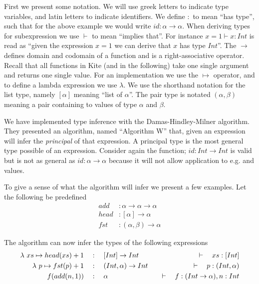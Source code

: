First we present some notation. We will use greek letters to indicate type variables, and latin letters to indicate identifiers. We define $:$ to mean ``has type'', such that for the above example we would write $id: \alpha \to \alpha$. When deriving types for subexpression we use $\vdash$ to mean ``implies that''. For instance $x = 1 \vdash x : Int$ is read as ``given the expression $x = 1$ we can derive that $x$ has type $Int$''. The $\to$ defines domain and codomain of a function and is a right-associative operator. Recall that all functions in Kite (and in the following) take one single argument and returns one single value. For an implementation we use the $\mapsto$ operator, and to define a lambda expression we use $\lambda$. We use the shorthand notation for the list type, namely $[\alpha]$ meaning ``list of $\alpha$''. The pair type is notated $(\alpha, \beta)$ meaning a pair containing to values of type $\alpha$ and $\beta$.

We have implemented type inference with the Damas-Hindley-Milner algorithm. They presented an algorithm, named ``Algorithm W''\cite[sec. 6]{milner82} that, given an expression will infer the \emph{principal} of that expression. A principal type is the most general type possible of an expression. Consider again the  function; $id:Int \to Int$ is valid but is not as general as $id: \alpha \to \alpha$ because it will not allow application to e.g.  and  values.

To give a sense of what the algorithm will infer we present a few examples. Let the following be predefined
\begin{align*}
  add    & : \alpha \to \alpha \to \alpha\\
  head   & : [\alpha] \to \alpha   \\
  fst    & : (\alpha, \beta) \to \alpha
\end{align*}

The algorithm can now infer the types of the following expressions
\begin{align*}
  \lambda{} \ xs \mapsto{} head(xs) + 1 & \quad:\quad [Int] \to Int         & \quad\vdash\quad xs : [Int]                  \\
  \lambda{} \ p \mapsto{} fst(p) + 1    & \quad:\quad (Int, \alpha) \to Int & \quad\vdash\quad p : (Int, \alpha)           \\
  f(add(n, 1))          & \quad:\quad \alpha                & \quad\vdash\quad f: (Int \to \alpha), n: Int \\
\end{align*}

